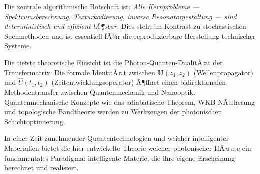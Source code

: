 ﻿\documentclass[a4paper,12pt]{article}
\theoremstyle{definition}
\newcommand{\matr}[1]{\mathbf{#1}}
\begin{document}
	Die zentrale algorithmische Botschaft ist: \emph{Alle Kernprobleme
		--- Spektrumsberechnung, Texturkodierung, inverse Resonatorgestaltung ---
		sind deterministisch und effizient lÃ¶sbar.} Dies steht im Kontrast zu
	stochastischen Suchmethoden und ist essentiell fÃ¼r die reproduzierbare
	Herstellung technischer Systeme.
	
	Die tiefste theoretische Einsicht ist die Photon-Quanten-DualitÃ¤t der
	Transfermatrix: Die formale IdentitÃ¤t zwischen $\matr{U}(z_1,z_2)$
	(Wellenpropagator) und $\hat{U}(t_1,t_2)$ (Zeitentwicklungsoperator)
	Ã¶ffnet einen bidirektionalen Methodentransfer zwischen Quantenmechanik
	und Nanooptik. Quantenmechanische Konzepte wie das adiabatische Theorem,
	WKB-NÃ¤herung und topologische Bandtheorie werden zu Werkzeugen der
	photonischen Schichtoptimierung.
	
	In einer Zeit zunehmender Quantentechnologien und weicher intelligenter
	Materialien bietet die hier entwickelte Theorie weicher photonischer
	HÃ¤ute ein fundamentales Paradigma: intelligente Materie, die ihre eigene
	Erscheinung berechnet und realisiert.
	
\end{document}
